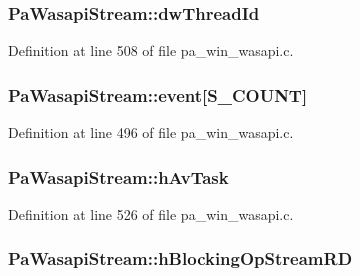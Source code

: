 \subsubsection[{\texorpdfstring{dw\+Thread\+Id}{dwThreadId}}]{ Pa\+Wasapi\+Stream\+::dw\+Thread\+Id}\hypertarget{struct_pa_wasapi_stream_abc0700afb38a68d4cbd42ee54aca2d82}{}\label{struct_pa_wasapi_stream_abc0700afb38a68d4cbd42ee54aca2d82}


Definition at line 508 of file pa\+\_\+win\+\_\+wasapi.\+c.

\subsubsection[{\texorpdfstring{event}{event}}]{ Pa\+Wasapi\+Stream\+::event\mbox{[}{\bf S\+\_\+\+C\+O\+U\+NT}\mbox{]}}\hypertarget{struct_pa_wasapi_stream_ac69c31cb5e9c6bb1b6736c660533cbfa}{}\label{struct_pa_wasapi_stream_ac69c31cb5e9c6bb1b6736c660533cbfa}


Definition at line 496 of file pa\+\_\+win\+\_\+wasapi.\+c.

\subsubsection[{\texorpdfstring{h\+Av\+Task}{hAvTask}}]{ Pa\+Wasapi\+Stream\+::h\+Av\+Task}\hypertarget{struct_pa_wasapi_stream_aae3a56871d156b6d8cfa2e070b408103}{}\label{struct_pa_wasapi_stream_aae3a56871d156b6d8cfa2e070b408103}


Definition at line 526 of file pa\+\_\+win\+\_\+wasapi.\+c.

\subsubsection[{\texorpdfstring{h\+Blocking\+Op\+Stream\+RD}{hBlockingOpStreamRD}}]{ Pa\+Wasapi\+Stream\+::h\+Blocking\+Op\+Stream\+RD}\hypertarget{struct_pa_wasapi_stream_a2298014f2cc2a5af5608ce2171c46429}{}\label{struct_pa_wasapi_stream_a2298014f2cc2a5af5608ce2171c46429}


